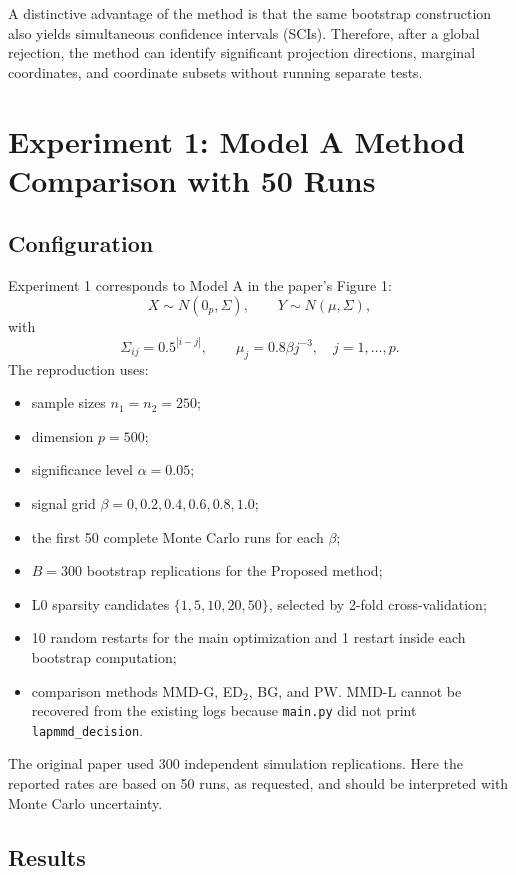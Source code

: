 \documentclass[a4paper,11pt]{article}
\begin{document}
A distinctive advantage of the method is that the same bootstrap construction also yields simultaneous confidence intervals (SCIs). Therefore, after a global rejection, the method can identify significant projection directions, marginal coordinates, and coordinate subsets without running separate tests.

\section{Experiment 1: Model A Method Comparison with 50 Runs}

\subsection{Configuration}

Experiment 1 corresponds to Model A in the paper's Figure 1:
\[
X\sim N(0_p,\Sigma),\qquad Y\sim N(\mu,\Sigma),
\]
with
\[
\Sigma_{ij}=0.5^{|i-j|},\qquad \mu_j=0.8\beta j^{-3},\quad j=1,\ldots,p.
\]
The reproduction uses:

\begin{itemize}
  \item sample sizes \(n_1=n_2=250\);
  \item dimension \(p=500\);
  \item significance level \(\alpha=0.05\);
  \item signal grid \(\beta=0,0.2,0.4,0.6,0.8,1.0\);
  \item the first 50 complete Monte Carlo runs for each \(\beta\);
  \item \(B=300\) bootstrap replications for the Proposed method;
  \item L0 sparsity candidates \(\{1,5,10,20,50\}\), selected by 2-fold cross-validation;
  \item 10 random restarts for the main optimization and 1 restart inside each bootstrap computation;
  \item comparison methods MMD-G, ED$_2$, BG, and PW. MMD-L cannot be recovered from the existing logs because \texttt{main.py} did not print \texttt{lapmmd\_decision}.
\end{itemize}

The original paper used 300 independent simulation replications. Here the reported rates are based on 50 runs, as requested, and should be interpreted with Monte Carlo uncertainty.

\subsection{Results}
\end{document}
